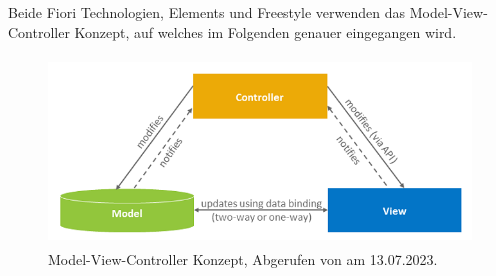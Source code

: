 Beide Fiori Technologien, Elements und Freestyle verwenden das Model-View-Controller Konzept, auf welches im Folgenden genauer eingegangen wird.
\begin{figure}[H]
 \centering
 \includegraphics[height=5cm]{Bilder/Fiori_Model-View-Controller-Konzept.png}
 \caption[Model-View-Controller Konzept]{Model-View-Controller Konzept, Abgerufen von \cite{sap_sapui5-sap-hel-docu_2023} am 13.07.2023.}
 \label{fig:iso_norm}
\end{figure}

